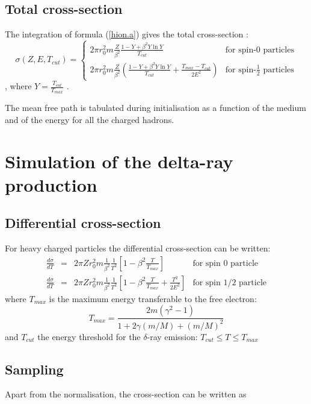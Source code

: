 \subsection{Total cross-section}
The integration of formula (\ref{hion.a}) gives the total cross-section :
\begin{equation}
\label{hion.d}
\sigma (Z,E,T_{cut}) = \left \{
\begin{array}{ll}
2 \pi r^2_0 m  \frac{Z}{\beta^2}
   \frac{1-Y+\beta^2 Y\ln Y}{T_{cut}} & \mbox{for spin-0 particles} \\ [.5cm]
2 \pi r^2_0 m  \frac{Z}{\beta^2} \left (\frac{1-Y+\beta^2 Y\ln Y}{T_{cut}}
+ \frac{T_{max}-T_{cut}} {2E^2} \right) &
\mbox{for spin-}\frac{1}{2}\mbox{~particles}
\end{array} \right .
\end{equation}
 , where  $Y = \frac{T_{cut}}{T_{max}} $ .

The mean free path is tabulated during initialisation
as a function of the medium and of the energy for all the charged hadrons. 

\section{Simulation of the delta-ray production}
\subsection{Differential cross-section}
For heavy charged particles the differential cross-section
can be written:
\[
\begin{array}{lcll}
\frac {d\sigma }{dT}&=& 2 \pi Z r^2_ 0 m\frac{1}{\beta^2 }\frac{1}{T^2}
\left[ 1- \beta^2 \frac{T} { T_{max} }\right]
& \mbox{for spin 0 particle} \\ [.3cm]
\frac{d \sigma} {dT}&=& 2 \pi Z r^2_0 m \frac{1}{\beta^2 } \frac{1}{T^2}
\left[1- \beta^ 2 \frac{T}{T_{max} }+ \frac{T^2} {2E^2}
 \right] &  \mbox{for spin 1/2 particle}
\end{array}
\]
where $T_{max}$  is the maximum energy transferable to the free electron:
\[
 T_{max}  = \frac{2m(\gamma^2 -1)} {1+2\gamma (m/M) +
(m/M)^2}
\]
and $T_{cut}$  the energy threshold for the $\delta$-ray emission:
$ T_{cut} \leq T \leq  T_{max} $

\subsection{Sampling}
Apart from the normalisation, the cross-section can be written as

